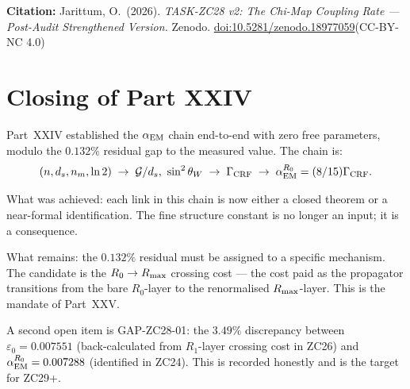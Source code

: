 \documentclass[12pt, a4paper]{article}
\begin{document}
\bigskip
\begin{center}
\textbf{Citation:} Jarittum, O.\ (2026).
\textit{TASK-ZC28 v2: The Chi-Map Coupling Rate ---
Post-Audit Strengthened Version.}
Zenodo. \href{https://doi.org/10.5281/zenodo.18977059}%
{doi:10.5281/zenodo.18977059}\quad (CC-BY-NC 4.0)
\end{center}

\bigskip


\section*{Closing of Part XXIV}

Part~XXIV established the $\alpha_{\rm EM}$ chain end-to-end with
zero free parameters, modulo the $0.132\%$ residual gap to the
measured value. The chain is:
\[
  (n, d_s, n_m, \ln 2)
  \;\to\; \mathcal{G}/d_s,\ \sin^2\theta_W
  \;\to\; \Gamma_{\rm CRF}
  \;\to\; \alpha_{\rm EM}^{R_0} = (8/15)\Gamma_{\rm CRF}.
\]

What was achieved: each link in this chain is now either a closed
theorem or a near-formal identification. The fine structure constant
is no longer an input; it is a consequence.

What remains: the $0.132\%$ residual must be assigned to a specific
mechanism. The candidate is the $R_0 \to R_{\rm max}$ crossing cost
--- the cost paid as the propagator transitions from the bare
$R_0$-layer to the renormalised $R_{\rm max}$-layer. This is the
mandate of Part~XXV.

A second open item is GAP-ZC28-01: the $3.49\%$ discrepancy between
$\varepsilon_0 = 0.007551$ (back-calculated from $R_1$-layer
crossing cost in ZC26) and $\alpha_{\rm EM}^{R_0} = 0.007288$
(identified in ZC24). This is recorded honestly and is the target
for ZC29+.
\end{document}
